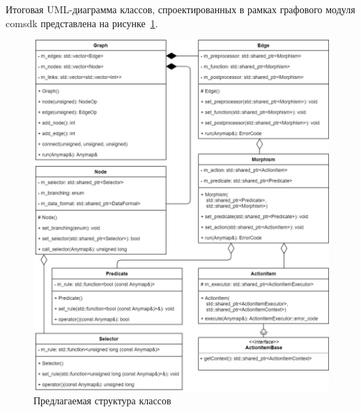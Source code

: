 Итоговая UML-диаграмма классов, спроектированных в рамках графового модуля comsdk представлена на рисунке~\ref{fig:suggestedGraphStructure}.
\begin{figure}[!ht]
    \centering
    \includegraphics[width=\textwidth]{figures/suggested_structure.png}
    \caption{Предлагаемая структура классов}
    \label{fig:suggestedGraphStructure}
\end{figure}


